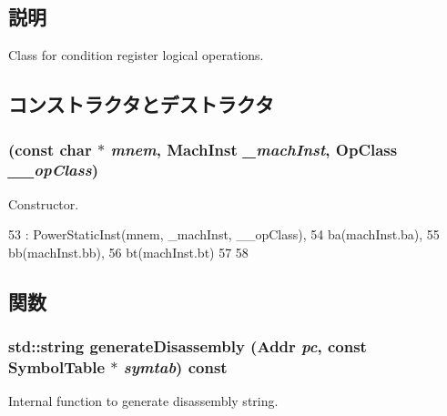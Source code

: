 \subsection{説明}
Class for condition register logical operations. 

\subsection{コンストラクタとデストラクタ}
\hypertarget{classPowerISA_1_1CondLogicOp_a4002ce3e4b4b2733134fb7414bcb89b4}{
\subsubsection[{CondLogicOp}]{ (const char $\ast$ {\em mnem}, \/  {\bf MachInst} {\em \_\-machInst}, \/  OpClass {\em \_\-\_\-opClass})}}
\label{classPowerISA_1_1CondLogicOp_a4002ce3e4b4b2733134fb7414bcb89b4}


Constructor. 


\begin{DoxyCode}
53       : PowerStaticInst(mnem, _machInst, __opClass),
54         ba(machInst.ba),
55         bb(machInst.bb),
56         bt(machInst.bt)
57     {
58     }
\end{DoxyCode}


\subsection{関数}
\hypertarget{classPowerISA_1_1CondLogicOp_a95d323a22a5f07e14d6b4c9385a91896}{
\subsubsection[{generateDisassembly}]{\setlength{\rightskip}{0pt plus 5cm}std::string generateDisassembly ({\bf Addr} {\em pc}, \/  const SymbolTable $\ast$ {\em symtab}) const}}
\label{classPowerISA_1_1CondLogicOp_a95d323a22a5f07e14d6b4c9385a91896}
Internal function to generate disassembly string. 

